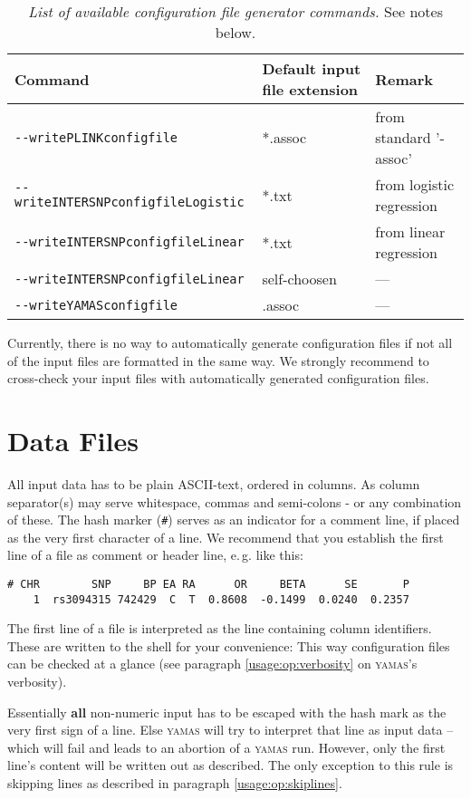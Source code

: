\begin{table}[H]
 \caption{\emph{List of available configuration file generator commands.} See notes below.}
 \centering
\begin{tabular}{lll}
\rowcolor{light-gray} Command & Default input file extension & Remark\\\hline
\verb+--writePLINKconfigfile+  & *.assoc      & from standard '-assoc'\\
\verb+--writeINTERSNPconfigfileLogistic+  & *.txt     & from logistic regression \\
\verb+--writeINTERSNPconfigfileLinear+  & *.txt     & from linear regression \\
\verb+--writeINTERSNPconfigfileLinear+ & self-choosen & ---\\
\verb+--writeYAMASconfigfile+ & .assoc & ---\\
\end{tabular}
\end{table}

Currently, there is no way to automatically generate configuration files if not all of the input files are formatted in the same way. We strongly recommend to cross-check your input files with automatically generated configuration files.

\section{Data Files}
\label{usage:datafiles}

All input data has to be plain ASCII-text, ordered in columns. As column separator(s) may serve whitespace, commas and semi-colons - or any combination of these. The hash marker (\verb+#+) serves as an indicator for a  comment line, if placed as the very first character of a line. We recommend that you establish the first line of a file as comment or header line, e.\,g. like this:

\begin{lstlisting}[style=Plain]
# CHR        SNP     BP EA RA      OR     BETA      SE       P
    1  rs3094315 742429  C  T  0.8608  -0.1499  0.0240  0.2357
\end{lstlisting}

The first line of a file is interpreted as the line containing column identifiers. These are written to the shell for your convenience: This way configuration files can be checked at a glance (see paragraph \ref{usage:op:verbosity} on \textsc{yamas}'s verbosity).

\alert{Essentially \textbf{all} non-numeric input has to be escaped with the hash mark as the very first sign of a line. Else \textsc{yamas} will try to interpret that line as input data -- which will fail and leads to an abortion of a \textsc{yamas} run. However, only the first line's content will be written out as described. The only exception to this rule is skipping lines as described in paragraph \ref{usage:op:skiplines}}.\\

